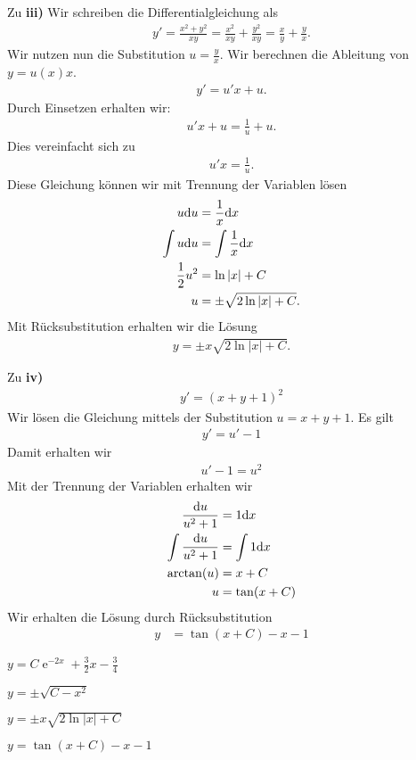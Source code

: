 {\begin{itemize}
\noindent Zu \textbf{iii)}
Wir schreiben die Differentialgleichung als
\begin{align*}
y' = \frac{x^2+y^2}{xy} = \frac{x^2}{xy} + \frac{y^2}{xy} = \frac{x}{y} +\frac{y}{x}.
\end{align*}
Wir nutzen nun die Substitution $u = \frac{y}{x}$. 
Wir berechnen die Ableitung von $y = u(x)x$.
\begin{align*}
y' = u'x+u.
\end{align*}
Durch Einsetzen erhalten wir:
\begin{align*}
u'x+u = \frac{1}{u}+u.
\end{align*}
Dies vereinfacht sich zu 
\begin{align*}
u'x= \frac{1}{u}.
\end{align*}
Diese Gleichung können wir mit Trennung der Variablen lösen
\begin{align*}
u \mathrm{d} u &= \frac{1}{x} \mathrm{d} x\\
\int u \mathrm{d} u &= \int \frac{1}{x} \mathrm{d} x \\
\frac{1}{2}u^2 &= \ln|x| + C \\
u &= \pm\sqrt{2\ln|x| +C}.
\end{align*}
Mit Rücksubstitution erhalten wir die Lösung
\begin{align*}
y = \pm x\sqrt{2\ln|x| +C}.
\end{align*}

\noindent Zu \textbf{iv)}
\begin{align*}
y'= (x+y+1)^2
\end{align*}
Wir lösen die Gleichung mittels der Substitution $u = x + y +1$.
Es gilt 
\begin{align*}
y' = u'-1 
\end{align*}
Damit erhalten wir 
\begin{align*}
u' - 1 = u^2
\end{align*}
Mit der Trennung der Variablen erhalten wir
\begin{align*}
\frac{\mathrm{d} u}{u^2 +1} &= 1\mathrm{d} x\\
\int\frac{\mathrm{d} u}{u^2 +1} &=\int 1\mathrm{d} x\\
\arctan(u) &= x + C \\
u &= \tan(x + C)
\end{align*}
Wir erhalten die Lösung durch Rücksubstitution
\begin{align*}
y &= \tan(x + C) -x-1
\end{align*}


\end{itemize}
}


{
\begin{iii}
\item $y = C\operatorname{e}^{-2x} +\frac{3}{2}x - \frac{3}{4}$
\item $y =\pm \sqrt{C-x^2}$
\item $y = \pm x\sqrt{2\ln|x| +C}$
\item $y = \tan(x + C) -x-1$
\end{iii}
}
